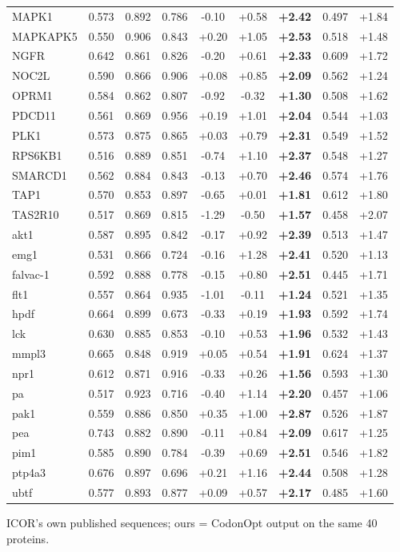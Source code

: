\begin{center}
\begin{tabular}{l|ccc|ccc|cc}
MAPK1 & 0.573 & 0.892 & 0.786 & -0.10 & +0.58 & \textbf{+2.42} & 0.497 & +1.84\\
MAPKAPK5 & 0.550 & 0.906 & 0.843 & +0.20 & +1.05 & \textbf{+2.53} & 0.518 & +1.48\\
NGFR & 0.642 & 0.861 & 0.826 & -0.20 & +0.61 & \textbf{+2.33} & 0.609 & +1.72\\
NOC2L & 0.590 & 0.866 & 0.906 & +0.08 & +0.85 & \textbf{+2.09} & 0.562 & +1.24\\
OPRM1 & 0.584 & 0.862 & 0.807 & -0.92 & -0.32 & \textbf{+1.30} & 0.508 & +1.62\\
PDCD11 & 0.561 & 0.869 & 0.956 & +0.19 & +1.01 & \textbf{+2.04} & 0.544 & +1.03\\
PLK1 & 0.573 & 0.875 & 0.865 & +0.03 & +0.79 & \textbf{+2.31} & 0.549 & +1.52\\
RPS6KB1 & 0.516 & 0.889 & 0.851 & -0.74 & +1.10 & \textbf{+2.37} & 0.548 & +1.27\\
SMARCD1 & 0.562 & 0.884 & 0.843 & -0.13 & +0.70 & \textbf{+2.46} & 0.574 & +1.76\\
TAP1 & 0.570 & 0.853 & 0.897 & -0.65 & +0.01 & \textbf{+1.81} & 0.612 & +1.80\\
TAS2R10 & 0.517 & 0.869 & 0.815 & -1.29 & -0.50 & \textbf{+1.57} & 0.458 & +2.07\\
akt1 & 0.587 & 0.895 & 0.842 & -0.17 & +0.92 & \textbf{+2.39} & 0.513 & +1.47\\
emg1 & 0.531 & 0.866 & 0.724 & -0.16 & +1.28 & \textbf{+2.41} & 0.520 & +1.13\\
falvac-1 & 0.592 & 0.888 & 0.778 & -0.15 & +0.80 & \textbf{+2.51} & 0.445 & +1.71\\
flt1 & 0.557 & 0.864 & 0.935 & -1.01 & -0.11 & \textbf{+1.24} & 0.521 & +1.35\\
hpdf & 0.664 & 0.899 & 0.673 & -0.33 & +0.19 & \textbf{+1.93} & 0.592 & +1.74\\
lck & 0.630 & 0.885 & 0.853 & -0.10 & +0.53 & \textbf{+1.96} & 0.532 & +1.43\\
mmpl3 & 0.665 & 0.848 & 0.919 & +0.05 & +0.54 & \textbf{+1.91} & 0.624 & +1.37\\
npr1 & 0.612 & 0.871 & 0.916 & -0.33 & +0.26 & \textbf{+1.56} & 0.593 & +1.30\\
pa & 0.517 & 0.923 & 0.716 & -0.40 & +1.14 & \textbf{+2.20} & 0.457 & +1.06\\
pak1 & 0.559 & 0.886 & 0.850 & +0.35 & +1.00 & \textbf{+2.87} & 0.526 & +1.87\\
pea & 0.743 & 0.882 & 0.890 & -0.11 & +0.84 & \textbf{+2.09} & 0.617 & +1.25\\
pim1 & 0.585 & 0.890 & 0.784 & -0.39 & +0.69 & \textbf{+2.51} & 0.546 & +1.82\\
ptp4a3 & 0.676 & 0.897 & 0.696 & +0.21 & +1.16 & \textbf{+2.44} & 0.508 & +1.28\\
ubtf & 0.577 & 0.893 & 0.877 & +0.09 & +0.57 & \textbf{+2.17} & 0.485 & +1.60\\
\hline\hline\end{tabular}\end{center}
ICOR's own published sequences; ours = CodonOpt output on the same 40 proteins.
